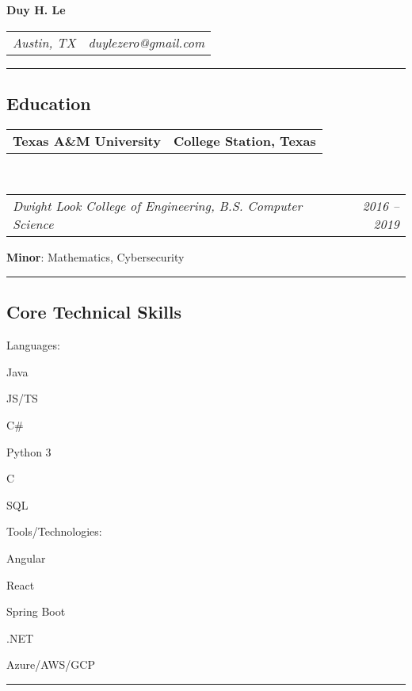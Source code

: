 \documentclass[10pt,letterpaper]{article}
\makeatletter
\newenvironment{indentsection}[1]%
{\begin{list}{}%
	{\setlength{\leftmargin}{#1}}%
	\item[]%
}
{\end{list}}
\newcommand{\headerrow}[2]
{\begin{tabular*}{\linewidth}{l@{\extracolsep{\fill}}r}
	#1 &
	#2 \\
\end{tabular*}}
\newcommand{\CPP}
{C\nolinebreak[4]\hspace{-.05em}\raisebox{.22ex}{\footnotesize\bf ++}}
\makeatother
\begin{document}
\begin{center}
{\LARGE \textbf{Duy H. Le}}
\end{center}
	\headerrow
		{\emph{Austin, TX}}
		{\emph{duylezero@gmail.com}}
\hrule
\vspace{-0.8em}
\subsection*{Education}

	\headerrow
		{\textbf{Texas A\&M University}}
		{\textbf{College Station, Texas}}
	\\
	\headerrow
		{\emph{Dwight Look College of Engineering, B.S. Computer Science}}
		{\emph{2016 -- 2019}}
	\vspace{-0.4em}
		 \textbf{Minor}: Mathematics, Cybersecurity \\

\hrule
\vspace{-0.8em}
\subsection*{Core Technical Skills}
\vspace{-0.4em}
\begin{indentsection}{\parindent}
\begin{description*}
	\item[Languages:]
	\begin{inparaitem}[\ * \ ]
		 Java
		\item JS/TS
		\item C\#
		\item Python 3
 		\item \CPP \ 
		\item SQL
	\end{inparaitem}
	\item[Tools/Technologies:]
		\begin{inparaitem}[\ * \ ]
 		 Angular
		\item React 
		\item Spring Boot
		\item .NET
		\item Azure/AWS/GCP
	\end{inparaitem}
\end{description*}
\end{indentsection}

\hrule
\vspace{-0.8em}
\end{document}
